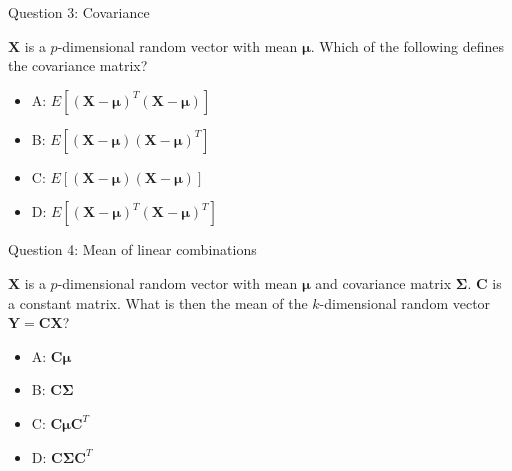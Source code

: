 \documentclass[ignorenonframetext,]{beamer}
\providecommand{\tightlist}{%
  \setlength{\itemsep}{0pt}\setlength{\parskip}{0pt}}
\begin{document}
\begin{frame}

\begin{block}{Question 3: Covariance}

\vspace{2mm}

\(\mathbf{X}\) is a \(p\)-dimensional random vector with mean
\(\mathbf{\mu}\). Which of the following defines the covariance matrix?

\begin{itemize}
\tightlist
\item
  A: \(E[(\mathbf{X}-\mathbf{\mu})^T(\mathbf{X}-\mathbf{\mu})]\)
\item
  B: \(E[(\mathbf{X}-\mathbf{\mu})(\mathbf{X}-\mathbf{\mu})^T]\)
\item
  C: \(E[(\mathbf{X}-\mathbf{\mu})(\mathbf{X}-\mathbf{\mu})]\)\\
\item
  D: \(E[(\mathbf{X}-\mathbf{\mu})^T(\mathbf{X}-\mathbf{\mu})^T]\)
\end{itemize}

\end{block}

\end{frame}

\begin{frame}

\begin{block}{Question 4: Mean of linear combinations}

\vspace{2mm}

\(\mathbf{X}\) is a \(p\)-dimensional random vector with mean
\(\mathbf{\mu}\) and covariance matrix \(\mathbf\Sigma\). \(\mathbf{C}\)
is a constant matrix. What is then the mean of the \(k\)-dimensional
random vector \(\mathbf{Y}=\mathbf{C}\mathbf{X}\)?

\begin{itemize}
\tightlist
\item
  A: \(\mathbf{C}\mathbf{\mu}\)
\item
  B: \(\mathbf{C}\mathbf\Sigma\)
\item
  C: \(\mathbf{C}\mathbf{\mu}\mathbf{C}^T\)
\item
  D: \(\mathbf{C}\mathbf\Sigma\mathbf{C}^T\)
\end{itemize}

\end{block}

\end{frame}
\end{document}
